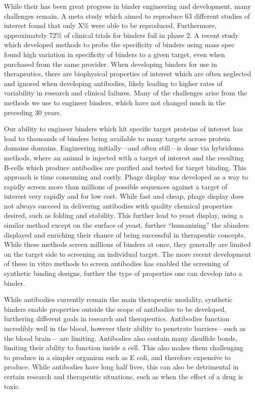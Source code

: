 While their has been great progress in binder engineering and development, many challenges remain\cite{Schonbrunn2014-nb,Parseghian2013-rq,Rhodes2006-za,Herrera2013-wm,Mechetner2011-cm,Perkel2014-df,Weller2016-xv}. A meta study which aimed to reproduce 63 different studies of interest found that only X\% were able to be reproduced\cite{Begley2012-vv}. Furthermore, approximately 72\% of clinical trials for binders fail in phase 2\cite{Ecker2015-jl}. A recent study which developed methods to probe the specificity of binders using mass spec found high variation in specificity of binders to a given target, even when purchased from the same provider\cite{Marcon2015-qr}. When developing binders for use in therapeutics, there are biophysical properties of interest which are often neglected and ignored when developing antibodies\cite{Jain2017-zg}, likely leading to higher rates of variability in research and clinical failures. Many of the challenges arise from the methods we use to engineer binders, which have not changed much in the preceding 30 years. 

Our ability to engineer binders which hit specific target proteins of interest has lead to thousands of binders being available to many targets across protein domains domains. Engineering initially---and often still---is done via hybridoma methods\cite{Kohler1975-oz}, where an animal is injected with a target of interest and the resulting B-cells which produce antibodies are purified and tested for target binding. This approach is time consuming and costly. Phage display was developed as a way to rapidly screen more than millions of possible sequences against a target of interest very rapidly and for low cost\cite{Hoet2005-qp}. While fast and cheap, phage display does not always succeed in delivering antibodies with quality chemical properties desired,  such as folding and stability\cite{Jain2017-zg}. This further lead to yeast display, using a similar method except on the surface of yeast, further “humanizing” the abinders displayed and enriching their chance of being successful in therapeutic concepts\cite{Boder1997-gx,Boder2000-ej}. While these methods screen millions of binders at once, they generally are limited on the target side to screening an individual target. The more recent development of these in vitro methods to screen antibodies has enabled the screening of synthetic binding designs, further the type of properties one can develop into a binder. 

While antibodies currently remain the main therapeutic modality, synthetic binders enable properties outside the scope of antibodies to be developed, furthering different goals in research and therapeutics\cite{Yu2017-qj}. Antibodies function incredibly well in the blood, however their ability to penetrate barriers---such as the blood brain--- are limiting\cite{Thom2018-ka}. Antibodies also contain many disulfide bonds, limiting their ability to function inside a cell\cite{Edelman1961-eg,Lo2008-qq}. This also makes them challenging to produce in a simpler organism such as E coli, and therefore expensive to produce. While antibodies have long half lives, this can also be detrimental in certain research and therapeutic situations, such as when the effect of a drug is toxic.

